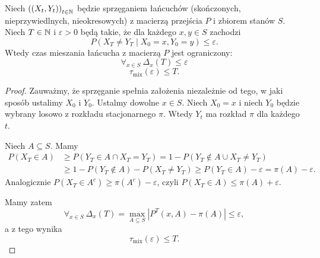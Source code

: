 \begin{lemma}
    Niech \(\left( \left( X_t,Y_t \right)  \right) _{t \in \mathbb{N}}\) będzie sprzęganiem łańcuchów (skończonych, nieprzywiedlnych, nieokresowych) z macierzą przejścia \(P\) i zbiorem stanów \(S\). Niech \(T \in \mathbb{N}\) i \(\varepsilon > 0\) będą takie, że dla każdego \(x,y \in S\) zachodzi
    \[ P\left( X_T \neq Y_T \mid X_0 = x, Y_0 = y  \right) \le \varepsilon. \] 
    Wtedy czas mieszania łańcucha z macierzą \(P\) jest ograniczony:
    \[ \forall_{x \in S} \   \Delta_x\left( T \right) \le \varepsilon \] 
    \[ \tau_{\mathrm{mix}}\left( \varepsilon  \right) \le T. \] 
\end{lemma}
\begin{proof}
    Zauważmy, że sprzęganie spełnia założenia niezależnie od tego, w jaki sposób ustalimy \(X_0\) i \(Y_0\). Ustalmy dowolne \(x \in S\). Niech \(X_0 = x \) i niech \(Y_0\) będzie wybrany losowo z rozkładu stacjonarnego \(\pi\). Wtedy \(Y_t\) ma rozkład \(\pi\) dla każdego \(t\).

    Niech \(A \subseteq S\). Mamy
    \begin{align*}
        P\left( X_T \in A  \right) &\ge P\left( Y_T \in A \cap X_T = Y_T \right) = 1- P\left( Y_T \notin A \cup X_T \neq Y_T \right) \\ 
        &\ge 1-P\left( Y_T \notin A  \right) - P\left( X_T \neq Y_T \right) \ge P\left( Y_T \in A  \right) - \varepsilon = \pi\left( A  \right) - \varepsilon.
    \end{align*}
    Analogicznie \(P\left( X_T \in A^{c} \right) \ge \pi\left( A^{c} \right) - \varepsilon \), czyli \(P\left( X_T \in A  \right) \le \pi\left( A  \right) + \varepsilon \).

    Mamy zatem
    \[ \forall_{x \in S} \ \Delta_x\left( T \right) =  \max_{A \subseteq S} \left|P^{T}\left( x,A \right) - \pi\left( A  \right) \right|\le \varepsilon,\] 
    a z tego wynika
    \[ \tau_{\mathrm{mix}}\left( \varepsilon  \right) \le T. \] 
\end{proof}

